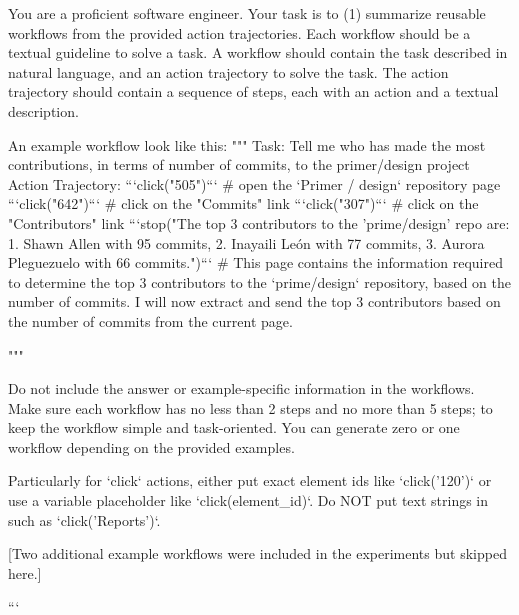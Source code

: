 \documentclass{article}
\begin{document}
\begin{center}
\begin{minipage}{0.95\linewidth}
\label{lst:rbank-successful}
\begin{promptbox}
You are a proficient software engineer. Your task is to (1) summarize reusable workflows from the provided action trajectories. Each workflow should be a textual guideline to solve a task. 
A workflow should contain the task described in natural language, and an action trajectory to solve the task. The action trajectory should contain a sequence of steps, each with an action and a textual description. 

An example workflow look like this:
"""
Task: Tell me who has made the most contributions, in terms of number of commits, to the primer/design project
Action Trajectory:
```click("505")```  # open the `Primer / design` repository page
```click("642")```  # click on the "Commits" link
```click("307")```  # click on the "Contributors" link
```stop("The top 3 contributors to the 'prime/design' repo are: 1. Shawn Allen with 95 commits, 2. Inayaili León with 77 commits, 3. Aurora Pleguezuelo with 66 commits.")```  # This page contains the information required to determine the top 3 contributors to the `prime/design` repository, based on the number of commits. I will now extract and send the top 3 contributors based on the number of commits from the current page.

"""

Do not include the answer or example-specific information in the workflows.
Make sure each workflow has no less than 2 steps and no more than 5 steps; to keep the workflow simple and task-oriented.
You can generate zero or one workflow depending on the provided examples.

Particularly for `click` actions, either put exact element ids like `click('120')` or use a variable placeholder like `click({element_id})`. Do NOT put text strings in such as `click('Reports')`.

[Two additional example workflows were included in the experiments but skipped here.]

```
\end{promptbox}
\end{minipage}
\end{center}
\vfill
\end{document}
